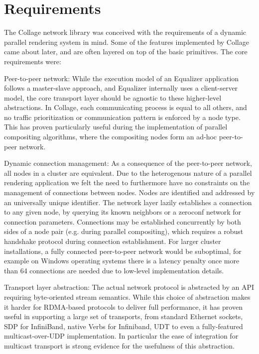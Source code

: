 \section{Requirements}

The Collage network library was conceived with the requirements of a dynamic
parallel rendering system in mind. Some of the features implemented by Collage
came about later, and are often layered on top of the basic primitives. The core
requirements were:

\begin{compactdesc}

\item[Peer-to-peer network:] While the execution model of an Equalizer
application follows a master-slave approach, and Equalizer internally uses a
client-server model, the core transport layer should be agnostic to these
higher-level abstractions. In Collage, each communicating process is equal to
all others, and no traffic prioritization or communication pattern is enforced
by a node type. This has proven particularly useful during the implementation of
parallel compositing algorithms, where the compositing nodes form an ad-hoc
peer-to-peer network.

\item[Dynamic connection management:] As a consequence of the peer-to-peer
network, all nodes in a cluster are equivalent. Due to the heterogenous nature
of a parallel rendering application we felt the need to furthermore have no
constraints on the management of connections between nodes. Nodes are
identified and addressed by an universally unique identifier. The network layer
lazily establishes a connection to any given node, by querying its known
neighbors or a zeroconf network for connection parameters. Connections may be
established concurrently by both sides of a node pair (e.g. during parallel
compositing), which requires a robust handshake protocol during connection
establishment. For larger cluster installations, a fully connected peer-to-peer
network would be suboptimal, for example on Windows operating systems there is
a latency penalty once more than 64 connections are needed due to low-level
implementation details.

\item[Transport layer abstraction:] The actual network protocol is abstracted
by an API requiring byte-oriented stream semantics. While this choice of
abstraction makes it harder for RDMA-based protocols to deliver full
performance, it has proven useful in supporting a large set of transports, from
standard Ethernet sockets, SDP for InfiniBand, native Verbs for Infiniband, UDT
to even a fully-featured multicast-over-UDP implementation. In particular the
ease of integration for multicast transport is strong evidence for the
usefulness of this abstraction.


\end{compactdesc}
